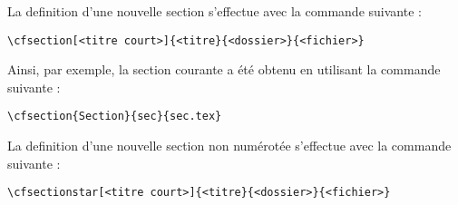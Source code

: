 La definition d'une nouvelle section s'effectue avec la commande suivante :
\begin{verbatim}
\cfsection[<titre court>]{<titre}{<dossier>}{<fichier>}
\end{verbatim}
Ainsi, par exemple, la section courante a \'et\'e obtenu en utilisant la commande suivante :
\begin{verbatim}
\cfsection{Section}{sec}{sec.tex}
\end{verbatim}
La definition d'une nouvelle section non num\'erot\'ee s'effectue avec la commande suivante :
\begin{verbatim}
\cfsectionstar[<titre court>]{<titre}{<dossier>}{<fichier>}
\end{verbatim}